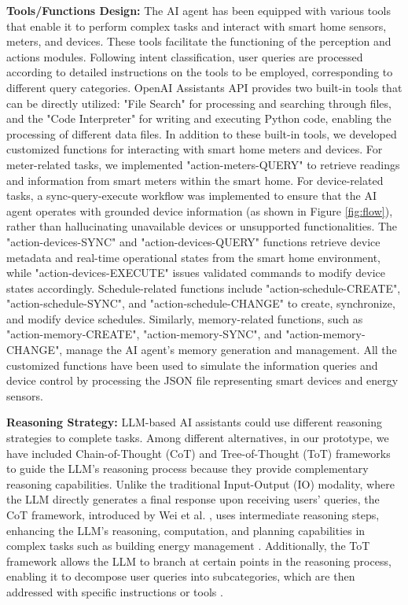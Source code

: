 \documentclass[final,3p,times]{elsarticle}
\begin{document}
\textbf{Tools/Functions Design:} The AI agent has been equipped with various tools that enable it to perform complex tasks and interact with smart home sensors, meters, and devices. These tools facilitate the functioning of the perception and actions modules. Following intent classification, user queries are processed according to detailed instructions on the tools to be employed, corresponding to different query categories. OpenAI Assistants API provides two built-in tools that can be directly utilized: "File Search" for processing and searching through files, and the "Code Interpreter" for writing and executing Python code, enabling the processing of different data files. In addition to these built-in tools, we developed customized functions for interacting with smart home meters and devices. For meter-related tasks, we implemented "action-meters-QUERY" to retrieve readings and information from smart meters within the smart home. For device-related tasks, a sync-query-execute workflow was implemented to ensure that the AI agent operates with grounded device information (as shown in Figure \ref{fig:flow}), rather than hallucinating unavailable devices or unsupported functionalities. The "action-devices-SYNC" and "action-devices-QUERY" functions retrieve device metadata and real-time operational states from the smart home environment, while "action-devices-EXECUTE" issues validated commands to modify device states accordingly. Schedule-related functions include "action-schedule-CREATE", "action-schedule-SYNC", and "action-schedule-CHANGE" to create, synchronize, and modify device schedules. Similarly, memory-related functions, such as "action-memory-CREATE", "action-memory-SYNC", and "action-memory-CHANGE", manage the AI agent’s memory generation and management. All the customized functions have been used to simulate the information queries and device control by processing the JSON file representing smart devices and energy sensors.


\textbf{Reasoning Strategy:} LLM-based AI assistants could use different reasoning strategies to complete tasks. Among different alternatives, in our prototype, we have included Chain-of-Thought (CoT) and Tree-of-Thought (ToT) frameworks to guide the LLM’s reasoning process \cite{besta2024demystifying} because they provide complementary reasoning capabilities. Unlike the traditional Input-Output (IO) modality, where the LLM directly generates a final response upon receiving users’ queries, the CoT framework, introduced by Wei et al. \cite{wei2022chain}, uses intermediate reasoning steps, enhancing the LLM’s reasoning, computation, and planning capabilities in complex tasks such as building energy management \cite{besta2024demystifying}. Additionally, the ToT framework allows the LLM to branch at certain points in the reasoning process, enabling it to decompose user queries into subcategories, which are then addressed with specific instructions or tools \cite{long2023large}.
\end{document}
